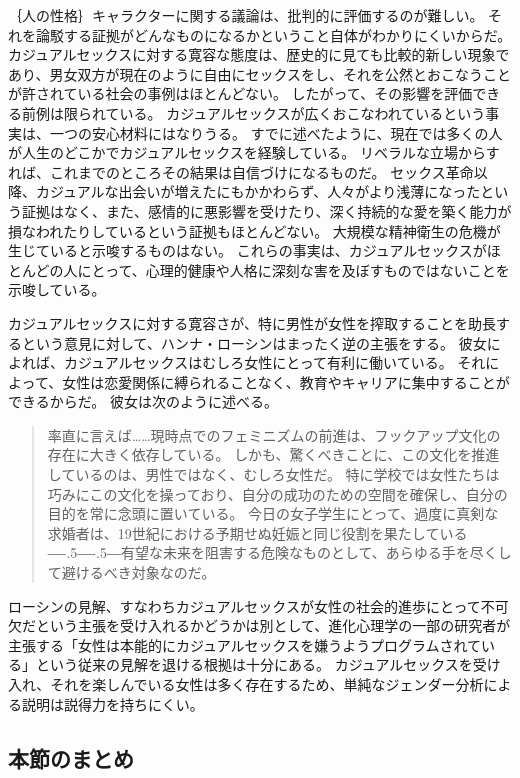 \documentclass[paper=a4,book,openany]{jlreq}
\def\DDASH{―\kern-.5\zw―\kern-.5\zw―} %
\begin{document}
｛人の性格｝{キャラクター}に関する議論は、批判的に評価するのが難しい。
それを論駁する証拠がどんなものになるかということ自体がわかりにくいからだ。
カジュアルセックスに対する寛容な態度は、歴史的に見ても比較的新しい現象であり、男女双方が現在のように自由にセックスをし、それを公然とおこなうことが許されている社会の事例はほとんどない。
したがって、その影響を評価できる前例は限られている。
カジュアルセックスが広くおこなわれているという事実は、一つの安心材料にはなりうる。
すでに述べたように、現在では多くの人が人生のどこかでカジュアルセックスを経験している。
リベラルな立場からすれば、これまでのところその結果は自信づけになるものだ。
セックス革命以降、カジュアルな出会いが増えたにもかかわらず、人々がより浅薄になったという証拠はなく、また、感情的に悪影響を受けたり、深く持続的な愛を築く能力が損なわれたりしているという証拠もほとんどない。
大規模な精神衛生の危機が生じていると示唆するものはない。
これらの事実は、カジュアルセックスがほとんどの人にとって、心理的健康や人格に深刻な害を及ぼすものではないことを示唆している。

カジュアルセックスに対する寛容さが、特に男性が女性を搾取することを助長するという意見に対して、ハンナ・ローシンはまったく逆の主張をする。
彼女によれば、カジュアルセックスはむしろ女性にとって有利に働いている。
それによって、女性は恋愛関係に縛られることなく、教育やキャリアに集中することができるからだ。
彼女は次のように述べる。

\begin{quote}
  率直に言えば……現時点でのフェミニズムの前進は、フックアップ文化の存在に大きく依存している。
しかも、驚くべきことに、この文化を推進しているのは、男性ではなく、むしろ女性だ。
特に学校では女性たちは巧みにこの文化を操っており、自分の成功のための空間を確保し、自分の目的を常に念頭に置いている。
今日の女子学生にとって、過度に真剣な求婚者は、19世紀における予期せぬ妊娠と同じ役割を果たしている{\DDASH}有望な未来を阻害する危険なものとして、あらゆる手を尽くして避けるべき対象なのだ。
\citep{rosin12:_boys_side}
\end{quote}

ローシンの見解、すなわちカジュアルセックスが女性の社会的進歩にとって不可欠だという主張を受け入れるかどうかは別として、進化心理学の一部の研究者が主張する「女性は本能的にカジュアルセックスを嫌うようプログラムされている」という従来の見解を退ける根拠は十分にある。
カジュアルセックスを受け入れ、それを楽しんでいる女性は多く存在するため、単純なジェンダー分析による説明は説得力を持ちにくい。

\subsection{本節のまとめ}
\end{document}
